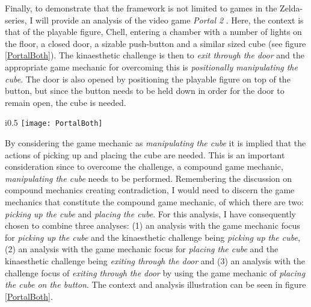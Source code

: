 Finally, to demonstrate that the framework is not limited to games in the Zelda-series, I will provide an analysis of the video game \textit{Portal 2} \cite{portaltwo}. Here, the context is that of the playable figure, Chell, entering a chamber with a number of lights on the floor, a closed door, a sizable push-button and a similar sized cube (see figure \ref{PortalBoth}). The kinaesthetic challenge is then to \textit{exit through the door} and the appropriate game mechanic for overcoming this is \textit{positionally manipulating the cube}. The door is also opened by positioning the playable figure on top of the button, but since the button needs to be held down in order for the door to remain open, the cube is needed.

\begin{wrapfigure}{i}{0.5\textwidth}
  \texttt{[image: PortalBoth]}
  \caption{Damaging the Octorok by swinging the sword in The Legend of Zelda: A Link to the Past as analysed through the game mechanic focus and the challenge focus interpretations combined}
  \label{PortalBoth}
\end{wrapfigure}

By considering the game mechanic as \textit{manipulating the cube} it is implied that the actions of picking up and placing the cube are needed. This is an important consideration since to overcome the challenge, a compound game mechanic, \textit{manipulating the cube} needs to be performed. Remembering the discussion on compound mechanics creating contradiction, I would need to discern the game mechanics that constitute the compound game mechanic, of which there are two: \textit{picking up the cube} and \textit{placing the cube}. For this analysis, I have consequently chosen to combine three analyses: (1) an analysis with the game mechanic focus for \textit{picking up the cube} and the kinaesthetic challenge being \textit{picking up the cube}, (2) an analysis with the game mechanic focus for \textit{placing the cube} and the kinaesthetic challenge being \textit{exiting through the door} and (3) an analysis with the challenge focus of \textit{exiting through the door} by using the game mechanic of \textit{placing the cube on the button}. The context and analysis illustration can be seen in figure \ref{PortalBoth}.

